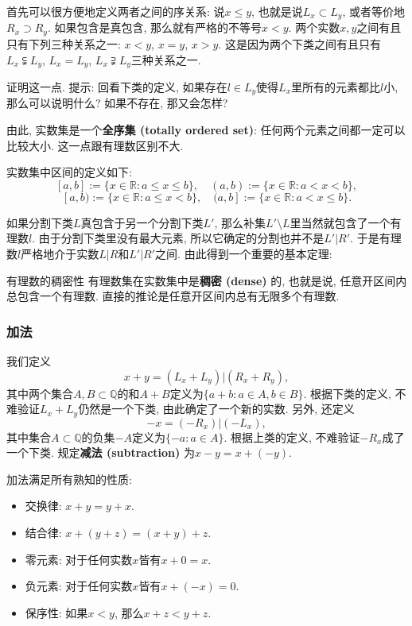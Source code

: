 首先可以很方便地定义两者之间的序关系: 说$x\leq y$, 也就是说$L_x\subset L_y$, 或者等价地$R_x\supset R_y$. 如果包含是真包含, 那么就有严格的不等号$x<y$. 两个实数$x,y$之间有且只有下列三种关系之一: $x<y$, $x=y$, $x>y$. 这是因为两个下类之间有且只有$L_x\subsetneqq L_y$, $L_x=L_y$, $L_x\supsetneqq L_y$三种关系之一.

\begin{exercise}{}
证明这一点. 提示: 回看下类的定义, 如果存在$l\in L_y$使得$L_x$里所有的元素都比$l$小, 那么可以说明什么? 如果不存在, 那又会怎样?
\end{exercise}

由此, 实数集是一个\textbf{全序集 (totally ordered set)}: 任何两个元素之间都一定可以比较大小. 这一点跟有理数区别不大.

实数集中区间的定义如下: 
$$
[a,b]:=\{x\in\mathbb{R}:a\leq x\leq b\},
\quad
(a,b):=\{x\in\mathbb{R}:a< x< b\},
$$
$$
[a,b):=\{x\in\mathbb{R}:a\leq x< b\},
\quad
(a,b]:=\{x\in\mathbb{R}:a< x\leq b\}.
$$

如果分割下类$L$真包含于另一个分割下类$L'$, 那么补集$L'\setminus L$里当然就包含了一个有理数$l$. 由于分割下类里没有最大元素, 所以它确定的分割也并不是$L'|R'$. 于是有理数$l$严格地介于实数$L|R$和$L'|R'$之间. 由此得到一个重要的基本定理:
\begin{theorem}{有理数的稠密性}
有理数集在实数集中是\textbf{稠密 (dense)} 的, 也就是说, 任意开区间内总包含一个有理数. 直接的推论是任意开区间内总有无限多个有理数.
\end{theorem}

\subsubsection{加法}

我们定义
$$
x+y=(L_x+L_y)|(R_x+R_y),
$$
其中两个集合$A,B\subset\mathbb{Q}$的和$A+B$定义为$\{a+b:a\in A, b\in B\}$. 根据下类的定义, 不难验证$L_x+L_y$仍然是一个下类, 由此确定了一个新的实数. 另外, 还定义
$$
-x=(-R_x)|(-L_x),
$$
其中集合$A\subset\mathbb{Q}$的负集$-A$定义为$\{-a:a\in A\}$. 根据上类的定义, 不难验证$-R_x$成了一个下类. 规定\textbf{减法 (subtraction)} 为$x-y=x+(-y)$.

加法满足所有熟知的性质:

\begin{itemize}
\item 交换律: $x+y=y+x$.
\item 结合律: $x+(y+z)=(x+y)+z$.
\item 零元素: 对于任何实数$x$皆有$x+0=x$.
\item 负元素: 对于任何实数$x$皆有$x+(-x)=0$.
\item 保序性: 如果$x<y$, 那么$x+z<y+z$.
\end{itemize}


